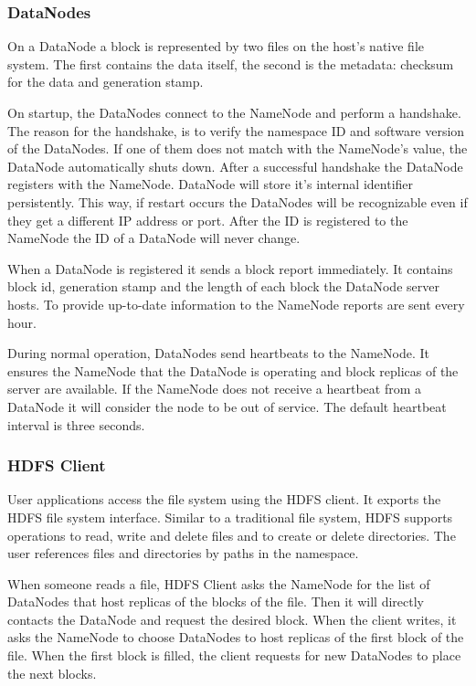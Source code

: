 \subsubsection*{DataNodes}
On a DataNode a block is represented by two files on the host's native file system. The first contains the data itself, the second is the metadata: checksum for the data and generation stamp. 

On startup, the DataNodes connect to the NameNode and perform a handshake. The reason for the handshake, is to verify the namespace ID and software version of the DataNodes. If one of them does not match with the NameNode's value, the DataNode automatically shuts down. After a successful handshake the DataNode registers with the NameNode. DataNode will store it's internal identifier persistently. This way, if restart occurs the DataNodes will be recognizable even if they get a different IP address or port. After the ID is registered to the NameNode the ID of a DataNode will never change. 

 When a DataNode is registered it sends a block report immediately. It contains  block id, generation stamp and the length of each block the DataNode server hosts. To provide up-to-date information to the NameNode reports are sent every hour. 

During normal operation, DataNodes send heartbeats to the NameNode. It ensures the NameNode that the DataNode is operating and block replicas of the server are available. If the NameNode does not receive a heartbeat from a DataNode it will consider the node to be out of service. The default heartbeat interval is three seconds.

\subsubsection*{HDFS Client}
User applications access the file system using the HDFS client. It exports the HDFS file system interface. Similar to a traditional file system, HDFS supports operations to read, write and delete files and to create or delete directories. The user references files and directories by paths in the namespace. 

When someone reads a file, HDFS Client asks the NameNode for the list of DataNodes that host replicas of the blocks of the file. Then it will directly contacts the DataNode and request the desired block. When the client writes, it asks the NameNode to choose DataNodes to host replicas of the first block of the file. When the first block is filled, the client requests for new DataNodes to place the next blocks.

